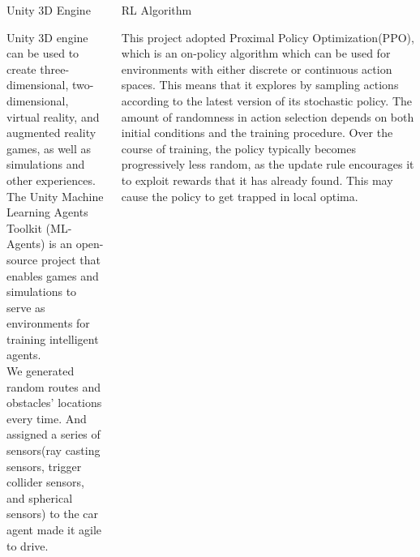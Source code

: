 \documentclass[final]{beamer}
\newlength{\onecolwid}
\newlength{\twocolwid}
\begin{document}
\begin{frame}[t]
\begin{columns}[t]
\begin{column}{\twocolwid} %

\begin{columns}[t,totalwidth=\twocolwid] %

\begin{column}{\onecolwid}\vspace{-.6in} %


\begin{block}{Unity 3D Engine} %

Unity 3D engine can be used to create three-dimensional, two-dimensional, virtual reality, and augmented reality games, as well as simulations and other experiences.\\

The Unity Machine Learning Agents Toolkit (ML-Agents) is an open-source project that enables games and simulations to serve as environments for training intelligent agents.\\

We generated random routes and obstacles' locations every time. And assigned a series of sensors(ray casting sensors, trigger collider sensors, and spherical sensors) to the car agent made it agile to drive.

\end{block}


\end{column} %

\begin{column}{\onecolwid}\vspace{-.6in} %


\begin{block}{RL Algorithm}

This project adopted Proximal Policy Optimization(PPO), which is an on-policy algorithm which can be used for environments with either discrete or continuous action spaces. This means that it explores by sampling actions according to the latest version of its stochastic policy. The amount of randomness in action selection depends on both initial conditions and the training procedure. Over the course of training, the policy typically becomes progressively less random, as the update rule encourages it to exploit rewards that it has already found. This may cause the policy to get trapped in local optima.


\end{block}
\end{column}
\end{columns}
\end{column}
\end{columns}
\end{frame}
\end{document}
